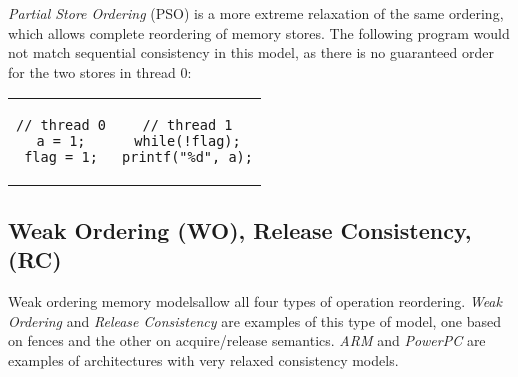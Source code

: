 \textit{Partial Store Ordering} (PSO) is a more extreme relaxation of the same
ordering, which allows complete reordering of memory stores.  The following
program would not match sequential consistency in this model, as there is no
guaranteed order for the two stores in thread 0:

\begin{center}
    \begin{tabular}{cc}
        \begin{lstlisting}[style=c]
// thread 0
a = 1;
flag = 1;
        \end{lstlisting}
        &
        \begin{lstlisting}[style=c]
// thread 1
while(!flag);
printf("%d", a);
        \end{lstlisting}
    \end{tabular}
\end{center}

\subsection{Weak Ordering (WO), Release Consistency, (RC)}

Weak ordering memory models\footnotemark allow all four types of operation
reordering.  \textit{Weak Ordering} and \textit{Release Consistency} are
examples of this type of model, one based on fences and the other on
acquire/release semantics.  \textit{ARM} and \textit{PowerPC} are examples of
architectures with very relaxed consistency models.

